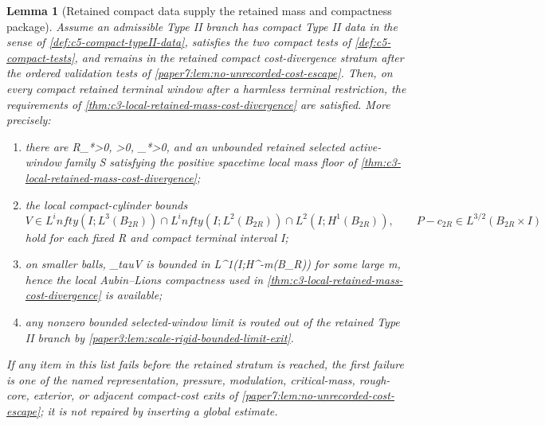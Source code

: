 \documentclass[11pt]{amsart}
\def\({}%
\def\){}%
\def\tau{tau}%
\def\infty{infty}%
\theoremstyle{plain}
\newtheorem{lemma}[lemma]{Lemma}
\theoremstyle{definition}
\theoremstyle{remark}
\begin{document}
\begin{lemma}[Retained compact data supply the retained mass and compactness package]
\label{lem:c5-retained-data-supply-aubin-lions}
Assume an admissible Type II branch has compact Type II data in the sense of
\cref{def:c5-compact-typeII-data}, satisfies the two compact tests of
\cref{def:c5-compact-tests}, and remains in the retained compact
cost-divergence stratum after the ordered validation tests of
\cref{paper7:lem:no-unrecorded-cost-escape}.  Then, on every compact retained
terminal window after a harmless terminal restriction, the requirements of
\cref{thm:c3-local-retained-mass-cost-divergence} are satisfied.  More precisely:
\begin{enumerate}[label=\textup{(\roman*)}]
\item there are \(R_*>0\), \(\theta>0\), \(\eta_*>0\), and an unbounded retained
selected active-window family \(\mathcal S\) satisfying the positive spacetime
local mass floor of \cref{thm:c3-local-retained-mass-cost-divergence};
\item the local compact-cylinder bounds
\[
  V\in L^\infty(I;L^3(B_{2R}))\cap L^\infty(I;L^2(B_{2R}))
  \cap L^2(I;H^1(B_{2R})),
  \qquad
  P-c_{2R}\in L^{3/2}(B_{2R}\times I)
\]
hold for each fixed \(R\) and compact terminal interval \(I\);
\item on smaller balls, \(\partial_\tau V\) is bounded in
\(L^1(I;H^{-m}(B_R))\) for some large \(m\), hence the local Aubin--Lions
compactness used in
\cref{thm:c3-local-retained-mass-cost-divergence} is available;
\item any nonzero bounded selected-window limit is routed out of the retained
Type II branch by \cref{paper3:lem:scale-rigid-bounded-limit-exit}.
\end{enumerate}
If any item in this list fails before the retained stratum is reached, the first
failure is one of the named representation, pressure, modulation, critical-mass,
rough-core, exterior, or adjacent compact-cost exits of
\cref{paper7:lem:no-unrecorded-cost-escape}; it is not repaired by inserting a
global estimate.
\end{lemma}
\end{document}

